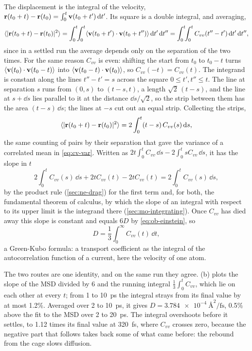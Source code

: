 The displacement is the integral of the velocity, $\bm{\mathrm{r}}(t_0 + t) -
\bm{\mathrm{r}}(t_0) = \int_0^t\bm{\mathrm{v}}(t_0 + t')\,\mathrm{d} t'$. Its square is a double
integral, and averaging,
\begin{equation*}
   \langle \lvert\bm{\mathrm{r}}(t_0 + t) - \bm{\mathrm{r}}(t_0)\rvert^2 \rangle
   = \int_0^t\!\!\int_0^t\langle \bm{\mathrm{v}}(t_0 + t')\cdot\bm{\mathrm{v}}(t_0 + t'') \rangle
   \,\mathrm{d} t'\,\mathrm{d} t''
   = \int_0^t\!\!\int_0^tC_{vv}(t'' - t')\,\mathrm{d} t'\,\mathrm{d} t'' ,
\end{equation*}
since in a settled run the average depends only on the separation of the
two times. For the same reason $C_{vv}$ is even: shifting the start from
$t_0$ to $t_0 - t$ turns $\langle \bm{\mathrm{v}}(t_0)\cdot\bm{\mathrm{v}}(t_0 - t) \rangle$ into
$\langle \bm{\mathrm{v}}(t_0 - t)\cdot\bm{\mathrm{v}}(t_0) \rangle$, so $C_{vv}(-t) = C_{vv}(t)$. The
integrand is constant along the lines $t'' - t' = s$ across the square $0
\le t', t'' \le t$. The line at separation $s$ runs from $(0, s)$ to $(t -
s, t)$, a length $\sqrt2\,(t - s)$, and the line at $s + \dd s$ lies
parallel to it at the distance $\dd s/\sqrt2$, so the strip between them
has the area $(t - s)\,\dd s$; the lines at $-s$ cut out an equal strip.
Collecting the strips,
\begin{equation}
   \langle \lvert\bm{\mathrm{r}}(t_0 + t) - \bm{\mathrm{r}}(t_0)\rvert^2 \rangle
   = 2\int_0^t(t - s)\,C_{vv}(s)\,\mathrm{d} s ,
   \label{eq:ob-msd-vacf}
\end{equation}
the same counting of pairs by their separation that gave the variance of
a correlated mean in \cref{eq:cv-var}. Written as $2t\int_0^tC_{vv}\,\dd s -
2\int_0^tsC_{vv}\,\dd s$, it has the slope in $t$
\begin{equation*}
   2\int_0^tC_{vv}(s)\,\dd s + 2tC_{vv}(t) - 2tC_{vv}(t)
   = 2\int_0^tC_{vv}(s)\,\dd s ,
\end{equation*}
by the product rule (\cref{sec:ne-drag}) for the first term and, for
both, the fundamental theorem of calculus, by which the slope of an
integral with respect to its upper limit is the integrand there
(\cref{sec:mo-integrating}). Once
$C_{vv}$ has died away this slope is constant and equals $6D$ by
\cref{eq:ob-einstein}, so
\begin{equation}
   D = \frac13\int_0^\infty C_{vv}(t)\,\dd t ,
   \label{eq:ob-gk}
\end{equation}
a Green-Kubo formula: a transport coefficient as the integral of the
autocorrelation function of a current, here the velocity of one
atom\cite{AllenTildesley2017}.

The two routes are one identity, and on the same run they agree.
(b) plots the slope of the MSD divided by 6 and the
running integral $\frac13\int_0^tC_{vv}$, which lie on each other at
every $t$; from 1 to \SI{10}{\pico\second} the integral strays from its
final value by at most 1.2\%. Averaged over 2 to \SI{10}{\pico\second}, it
gives $D = \SI{3.784e-4}{\angstrom\squared\per\femto\second}$, 0.5\% above
the fit to the MSD over 2 to \SI{20}{\pico\second}. The integral
overshoots before it settles, to 1.12 times its final value at
\SI{320}{\femto\second}, where $C_{vv}$ crosses zero, because the
negative part that follows takes back some of what came before: the
rebound from the cage slows diffusion.

